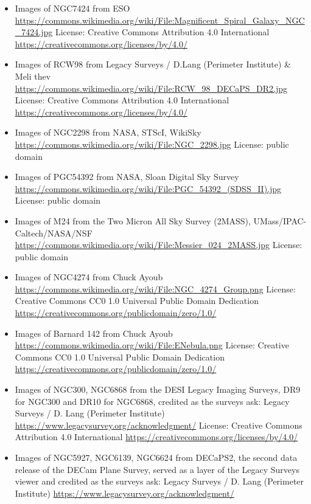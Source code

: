 \begin{itemize}
	 from ESA/Hubble & NASA
	 \url{https://commons.wikimedia.org/wiki/File:Potw1431a.jpg}
	 License: Creative Commons Attribution 3.0 Unported \url{https://creativecommons.org/licenses/by/3.0/}
\item Images of NGC7424
	 from ESO
	 \url{https://commons.wikimedia.org/wiki/File:Magnificent_Spiral_Galaxy_NGC_7424.jpg}
	 License: Creative Commons Attribution 4.0 International \url{https://creativecommons.org/licenses/by/4.0/}
\item Images of RCW98
	 from Legacy Surveys / D.Lang (Perimeter Institute) & Meli thev
	 \url{https://commons.wikimedia.org/wiki/File:RCW_98_DECaPS_DR2.jpg}
	 License: Creative Commons Attribution 4.0 International \url{https://creativecommons.org/licenses/by/4.0/}
\item Images of NGC2298
	 from NASA, STScI, WikiSky
	 \url{https://commons.wikimedia.org/wiki/File:NGC_2298.jpg}
	 License: public domain
\item Images of PGC54392
	 from NASA, Sloan Digital Sky Survey
	 \url{https://commons.wikimedia.org/wiki/File:PGC_54392_(SDSS_II).jpg}
	 License: public domain
\item Images of M24
	 from the Two Micron All Sky Survey (2MASS), UMass/IPAC-Caltech/NASA/NSF
	 \url{https://commons.wikimedia.org/wiki/File:Messier_024_2MASS.jpg}
	 License: public domain
\item Images of NGC4274
	 from Chuck Ayoub
	 \url{https://commons.wikimedia.org/wiki/File:NGC_4274_Group.png}
	 License: Creative Commons CC0 1.0 Universal Public Domain Dedication \url{https://creativecommons.org/publicdomain/zero/1.0/}
\item Images of Barnard 142
	 from Chuck Ayoub
	 \url{https://commons.wikimedia.org/wiki/File:ENebula.png}
	 License: Creative Commons CC0 1.0 Universal Public Domain Dedication \url{https://creativecommons.org/publicdomain/zero/1.0/}
\item Images of NGC300, NGC6868
	 from the DESI Legacy Imaging Surveys, DR9 for NGC300 and DR10 for NGC6868, credited as the surveys ask: Legacy Surveys / D. Lang (Perimeter Institute)
	 \url{https://www.legacysurvey.org/acknowledgment/}
	 License: Creative Commons Attribution 4.0 International \url{https://creativecommons.org/licenses/by/4.0/}
\item Images of NGC5927, NGC6139, NGC6624
	 from DECaPS2, the second data release of the DECam Plane Survey, served as a layer of the Legacy Surveys viewer and credited as the surveys ask: Legacy Surveys / D. Lang (Perimeter Institute)
	 \url{https://www.legacysurvey.org/acknowledgment/}

\end{itemize}
